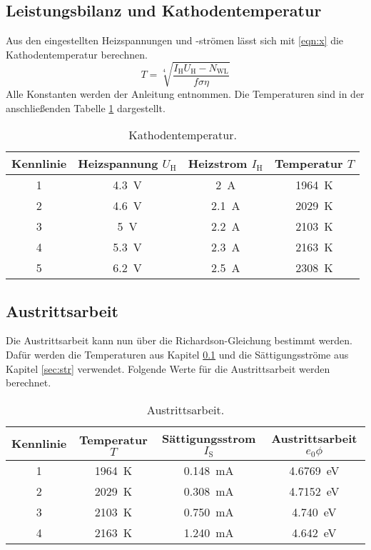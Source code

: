 \FloatBarrier
\subsection{Leistungsbilanz und Kathodentemperatur}
\label{sec:temp}

Aus den eingestellten Heizspannungen und -strömen lässt sich mit \eqref{eqn:x} die Kathodentemperatur berechnen.
\begin{equation}
  T = \sqrt[4]{\frac{I_\text{H} U_\text{H} - N_\text{WL}}{f \sigma \eta}}
  \label{eqn:x}
\end{equation}
Alle Konstanten werden der Anleitung entnommen.
Die Temperaturen sind in der anschließenden Tabelle \ref{tab:d} dargestellt.
\begin{table}
\centering
\caption{Kathodentemperatur.}
\label{tab:d}
\begin{tabular}{c c c c}
\toprule
Kennlinie & Heizspannung $U_\text{H}$ & Heizstrom $I_\text{H}$ & Temperatur $T$ \\
\midrule
1 & \SI{4.3}{\volt} & \SI{2}{\ampere}   & \SI{1964}{\kelvin} \\
2 & \SI{4.6}{\volt} & \SI{2.1}{\ampere} & \SI{2029}{\kelvin} \\
3 & \SI{5}{\volt}   & \SI{2.2}{\ampere} & \SI{2103}{\kelvin} \\
4 & \SI{5.3}{\volt} & \SI{2.3}{\ampere} & \SI{2163}{\kelvin} \\
5 & \SI{6.2}{\volt} & \SI{2.5}{\ampere} & \SI{2308}{\kelvin} \\
\bottomrule
\end{tabular}
\end{table}

\FloatBarrier
\subsection{Austrittsarbeit}

Die Austrittsarbeit kann nun über die Richardson-Gleichung bestimmt werden.
Dafür werden die Temperaturen aus Kapitel \ref{sec:temp} und die Sättigungsströme aus Kapitel \ref{sec:str} verwendet.
Folgende Werte für die Austrittsarbeit werden berechnet.
\begin{table}
\centering
\caption{Austrittsarbeit.}
\label{tab:e}
\begin{tabular}{c c c c}
\toprule
Kennlinie & Temperatur $T$ & Sättigungsstrom $I_\text{S}$ & Austrittsarbeit $e_0 \phi$ \\
\midrule
1 & \SI{1964}{\kelvin} & \SI{0.148}{\milli\ampere}   & \SI{4.6769}{\eV} \\
2 & \SI{2029}{\kelvin} & \SI{0.308}{\milli\ampere}   & \SI{4.7152}{\eV} \\
3 & \SI{2103}{\kelvin} & \SI{0.750}{\milli\ampere}  & \SI{4.740}{\eV} \\
4 & \SI{2163}{\kelvin} & \SI{1.240}{\milli\ampere} & \SI{4.642}{\eV} \\
\bottomrule
\end{tabular}
\end{table}
